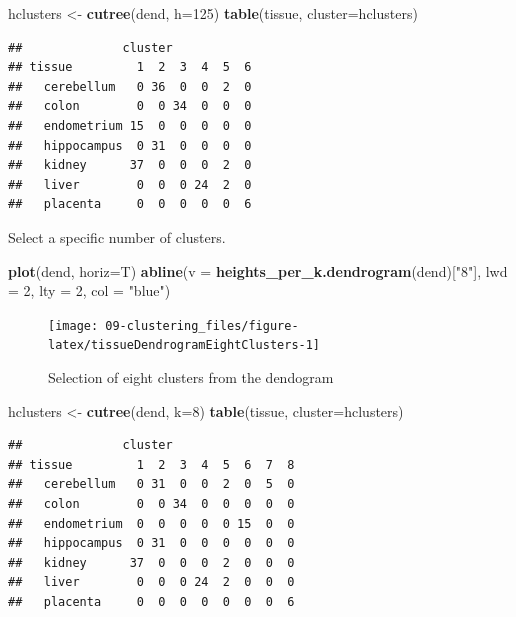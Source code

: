 \documentclass[]{book}
\newenvironment{Shaded}{\begin{snugshade}}{\end{snugshade}}
\newcommand{\KeywordTok}[1]{\textcolor[rgb]{0.13,0.29,0.53}{\textbf{{#1}}}}
\newcommand{\DataTypeTok}[1]{\textcolor[rgb]{0.13,0.29,0.53}{{#1}}}
\newcommand{\DecValTok}[1]{\textcolor[rgb]{0.00,0.00,0.81}{{#1}}}
\newcommand{\StringTok}[1]{\textcolor[rgb]{0.31,0.60,0.02}{{#1}}}
\newcommand{\NormalTok}[1]{{#1}}
\theoremstyle{definition}
\theoremstyle{definition}
\theoremstyle{definition}
\theoremstyle{remark}
\begin{document}
\begin{Shaded}
\begin{Highlighting}[]
\NormalTok{hclusters <-}\StringTok{ }\KeywordTok{cutree}\NormalTok{(dend, }\DataTypeTok{h=}\DecValTok{125}\NormalTok{)}
\KeywordTok{table}\NormalTok{(tissue, }\DataTypeTok{cluster=}\NormalTok{hclusters)}
\end{Highlighting}
\end{Shaded}

\begin{verbatim}
##              cluster
## tissue         1  2  3  4  5  6
##   cerebellum   0 36  0  0  2  0
##   colon        0  0 34  0  0  0
##   endometrium 15  0  0  0  0  0
##   hippocampus  0 31  0  0  0  0
##   kidney      37  0  0  0  2  0
##   liver        0  0  0 24  2  0
##   placenta     0  0  0  0  0  6
\end{verbatim}

Select a specific number of clusters.

\begin{Shaded}
\begin{Highlighting}[]
\KeywordTok{plot}\NormalTok{(dend, }\DataTypeTok{horiz=}\NormalTok{T)}
\KeywordTok{abline}\NormalTok{(}\DataTypeTok{v =} \KeywordTok{heights_per_k.dendrogram}\NormalTok{(dend)[}\StringTok{"8"}\NormalTok{], }\DataTypeTok{lwd =} \DecValTok{2}\NormalTok{, }\DataTypeTok{lty =} \DecValTok{2}\NormalTok{, }\DataTypeTok{col =} \StringTok{"blue"}\NormalTok{)}
\end{Highlighting}
\end{Shaded}

\begin{figure}

{\centering \texttt{[image: 09-clustering\_files/figure-latex/tissueDendrogramEightClusters-1]} 

}

\caption{Selection of eight clusters from the dendogram}\label{fig:tissueDendrogramEightClusters}
\end{figure}

\begin{Shaded}
\begin{Highlighting}[]
\NormalTok{hclusters <-}\StringTok{ }\KeywordTok{cutree}\NormalTok{(dend, }\DataTypeTok{k=}\DecValTok{8}\NormalTok{)}
\KeywordTok{table}\NormalTok{(tissue, }\DataTypeTok{cluster=}\NormalTok{hclusters)}
\end{Highlighting}
\end{Shaded}

\begin{verbatim}
##              cluster
## tissue         1  2  3  4  5  6  7  8
##   cerebellum   0 31  0  0  2  0  5  0
##   colon        0  0 34  0  0  0  0  0
##   endometrium  0  0  0  0  0 15  0  0
##   hippocampus  0 31  0  0  0  0  0  0
##   kidney      37  0  0  0  2  0  0  0
##   liver        0  0  0 24  2  0  0  0
##   placenta     0  0  0  0  0  0  0  6
\end{verbatim}
\end{document}
